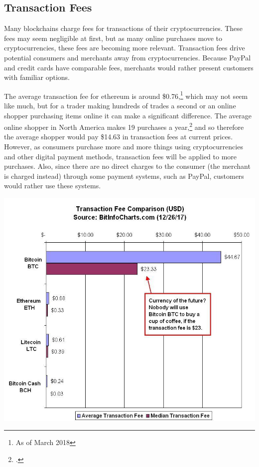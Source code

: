\documentclass[letter]{article}
\begin{document}
\subsection{Transaction Fees}
Many blockchains charge fees for transactions of their cryptocurrencies. These fees may seem negligible at first, but as many online purchases move to cryptocurrencies, these fees are becoming more relevant. Transaction fees drive potential consumers and merchants away from cryptocurrencies. Because PayPal and credit cards have comparable fees, merchants would rather present customers with familiar options.

The average transaction fee for ethereum is around \$0.76,\footnote{As of March 2018} which may not seem like much, but for a trader making hundreds of trades a second or an online shopper purchasing items online it can make a significant difference. The average online shopper in North America makes 19 purchases a year,\footcite{statista} and so therefore the average shopper would pay \$14.63 in transaction fees at current prices. However, as consumers purchase more and more things using cryptocurrencies and other digital payment methods, transaction fees will be applied to more purchases. Also, since there are no direct charges to the consumer (the merchant is charged instead) through some payment systems, such as PayPal, customers would rather use these systems.

\includegraphics[width=\textwidth]{bitcoin_fees}
\end{document}
